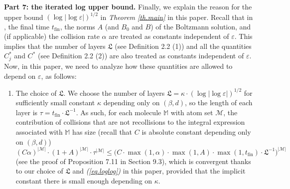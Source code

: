 \documentclass[10pt, reqno]{amsart}
\newcommand{\Mb}{\mathbb M}
\renewcommand{\Mc}{\mathcal M}
\newcommand{\Lf}{\mathfrak L}
\theoremstyle{definition}
\theoremstyle{remark}
\numberwithin{equation}{section}
\begin{document}
\medskip
\textbf{Part 7: the iterated log upper bound.} Finally, we explain the reason for the upper bound $(\log|\log\varepsilon|)^{1/2}$ in \emph{Theorem \ref{th.main}} in this paper. Recall that in \cite{DHM24}, the final time $t_{\mathrm{fin}}$, the norms $A$ (and $B_0$ and $B$) of the Boltzmann solution, and (if applicable) the collision rate $\alpha$ are treated as constants independent of $\varepsilon$. This implies that the number of layers $\Lf$ (see Definition 2.2 (1)) and all the quantities $C_j^*$ and $C^*$ (see Definition 2.2 (2)) are also treated as constants independent of $\varepsilon$. Now, in this paper, we need to analyze how these quantities are allowed to depend on $\varepsilon$, as follows:
\begin{enumerate}
\item The choice of $\Lf$. We choose the number of layers $\Lf=\kappa\cdot (\log|\log\varepsilon|)^{1/2}$ for sufficiently small constant $\kappa$ depending only on $(\beta,d)$, so the length of each layer is $\tau=t_{\mathrm{fin}}\cdot \Lf^{-1}$. As such, for each molecule $\Mb$ with atom set $\Mc$, the contribution of collisions that are not recollisions to the integral expression associated with $\Mb$ has size (recall that $C$ is absolute constant depending only on $(\beta,d)$)
\begin{equation}\label{eq.remark1}
(C\alpha)^{|\Mc|}\cdot (1+A)^{|\Mc|}\cdot\tau^{|\Mc|}\leq\big(C\cdot \max(1,\alpha)\cdot\max(1,A)\cdot\max(1,t_{\mathrm{fin}})\cdot \Lf^{-1}\big)^{|\Mc|}
\end{equation} (see the proof of Proposition 7.11 in Section 9.3), which is convergent thanks to our choice of $\Lf$ and \emph{(\ref{eq.loglog})} in this paper, provided that the implicit constant there is small enough depending on $\kappa$.


\end{enumerate}
\end{document}
